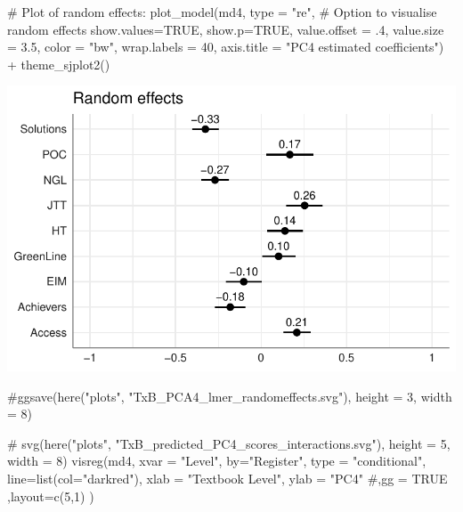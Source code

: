\documentclass[
  letterpaper,
  DIV=11,
  numbers=noendperiod]{scrreprt}
\newenvironment{Shaded}{\begin{snugshade}}{\end{snugshade}}
\newcommand{\AttributeTok}[1]{\textcolor[rgb]{0.40,0.45,0.13}{#1}}
\newcommand{\CommentTok}[1]{\textcolor[rgb]{0.37,0.37,0.37}{#1}}
\newcommand{\ConstantTok}[1]{\textcolor[rgb]{0.56,0.35,0.01}{#1}}
\newcommand{\DecValTok}[1]{\textcolor[rgb]{0.68,0.00,0.00}{#1}}
\newcommand{\FloatTok}[1]{\textcolor[rgb]{0.68,0.00,0.00}{#1}}
\newcommand{\FunctionTok}[1]{\textcolor[rgb]{0.28,0.35,0.67}{#1}}
\newcommand{\NormalTok}[1]{\textcolor[rgb]{0.00,0.23,0.31}{#1}}
\newcommand{\SpecialCharTok}[1]{\textcolor[rgb]{0.37,0.37,0.37}{#1}}
\newcommand{\StringTok}[1]{\textcolor[rgb]{0.13,0.47,0.30}{#1}}
\begin{document}
\begin{Shaded}
\begin{Highlighting}[]
\CommentTok{\# Plot of random effects:}
\FunctionTok{plot\_model}\NormalTok{(md4, }
           \AttributeTok{type =} \StringTok{"re"}\NormalTok{, }\CommentTok{\# Option to visualise random effects}
           \AttributeTok{show.values=}\ConstantTok{TRUE}\NormalTok{, }
           \AttributeTok{show.p=}\ConstantTok{TRUE}\NormalTok{,}
           \AttributeTok{value.offset =}\NormalTok{ .}\DecValTok{4}\NormalTok{,}
           \AttributeTok{value.size =} \FloatTok{3.5}\NormalTok{,}
           \AttributeTok{color =} \StringTok{"bw"}\NormalTok{,}
           \AttributeTok{wrap.labels =} \DecValTok{40}\NormalTok{,}
           \AttributeTok{axis.title =} \StringTok{"PC4 estimated coefficients"}\NormalTok{) }\SpecialCharTok{+}
  \FunctionTok{theme\_sjplot2}\NormalTok{()}
\end{Highlighting}
\end{Shaded}

\includegraphics{E_Ch6_Analysis_files/figure-pdf/unnamed-chunk-31-1.pdf}

\begin{Shaded}
\begin{Highlighting}[]
\CommentTok{\#ggsave(here("plots", "TxB\_PCA4\_lmer\_randomeffects.svg"), height = 3, width = 8)}
\end{Highlighting}
\end{Shaded}

\begin{Shaded}
\begin{Highlighting}[]
\CommentTok{\# svg(here("plots", "TxB\_predicted\_PC4\_scores\_interactions.svg"), height = 5, width = 8)}
\FunctionTok{visreg}\NormalTok{(md4, }\AttributeTok{xvar =} \StringTok{"Level"}\NormalTok{, }\AttributeTok{by=}\StringTok{"Register"}\NormalTok{, }\AttributeTok{type =} \StringTok{"conditional"}\NormalTok{,}
       \AttributeTok{line=}\FunctionTok{list}\NormalTok{(}\AttributeTok{col=}\StringTok{"darkred"}\NormalTok{), }
       \AttributeTok{xlab =} \StringTok{"Textbook Level"}\NormalTok{, }\AttributeTok{ylab =} \StringTok{"PC4"}
       \CommentTok{\#,gg = TRUE}
\NormalTok{       ,}\AttributeTok{layout=}\FunctionTok{c}\NormalTok{(}\DecValTok{5}\NormalTok{,}\DecValTok{1}\NormalTok{)}
\NormalTok{)}
\end{Highlighting}
\end{Shaded}
\end{document}
